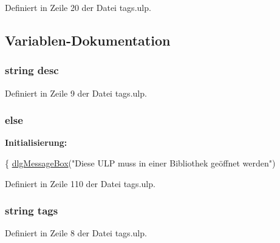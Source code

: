 Definiert in Zeile 20 der Datei tags.\+ulp.



\subsection{Variablen-\/\+Dokumentation}
\hypertarget{tags_8ulp_acc6fde76f2c440ef4a9f7dc3765038b5}{}
\subsubsection[{desc}]{\setlength{\rightskip}{0pt plus 5cm}string desc}\label{tags_8ulp_acc6fde76f2c440ef4a9f7dc3765038b5}


Definiert in Zeile 9 der Datei tags.\+ulp.

\hypertarget{tags_8ulp_a0544c3fe466e421738dae463968b70ba}{}
\subsubsection[{else}]{\setlength{\rightskip}{0pt plus 5cm}else}\label{tags_8ulp_a0544c3fe466e421738dae463968b70ba}
{\bfseries Initialisierung\+:}
\begin{DoxyCode}
\{
    \hyperlink{_l_p-_daten_8ulp_a9a9b6799eeeaeb061d7aa5bed52bf99b}{dlgMessageBox}(\textcolor{stringliteral}{"Diese ULP muss in einer Bibliothek geöffnet werden"})
\end{DoxyCode}


Definiert in Zeile 110 der Datei tags.\+ulp.

\hypertarget{tags_8ulp_abdb764edc6b6729ff73d7c926d6ae6b4}{}
\subsubsection[{tags}]{\setlength{\rightskip}{0pt plus 5cm}string tags}\label{tags_8ulp_abdb764edc6b6729ff73d7c926d6ae6b4}


Definiert in Zeile 8 der Datei tags.\+ulp.

